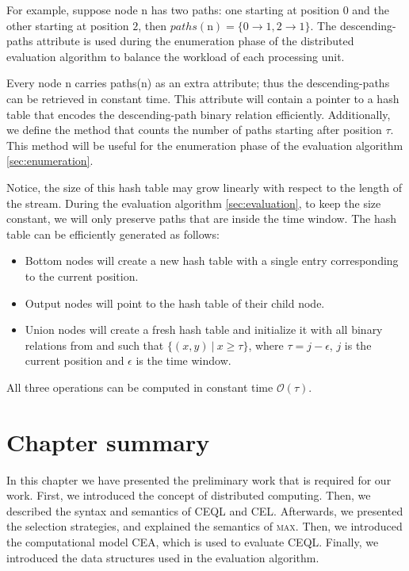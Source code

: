 {For example, suppose node \textrm{n} has two paths: one starting at position $0$ and the other starting at position $2$, then $paths(\textrm{n}) = {\{0 \to 1, 2 \to 1\}}$. The descending-paths attribute is used during the enumeration phase of the distributed evaluation algorithm to balance the workload of each processing unit.

Every node \textrm{n} carries paths(\textrm{n}) as an extra attribute; thus the descending-paths can be retrieved in constant time. This attribute will contain a pointer to a hash table that encodes the descending-path binary relation efficiently. Additionally, we define the method  that counts the number of paths starting after position $\tau$. This method will be useful for the enumeration phase of the evaluation algorithm \ref{sec:enumeration}.

Notice, the size of this hash table may grow linearly with respect to the length of the stream. During the evaluation algorithm \ref{sec:evaluation}, to keep the size constant, we will only preserve paths that are inside the time window. The hash table can be efficiently generated as follows:

\begin{itemize}
  \item Bottom nodes will create a new hash table with a single entry corresponding to the current position.
  \item Output nodes will point to the hash table of their child node.
  \item Union nodes will create a fresh hash table and initialize it with all binary relations from  and  such that $\{(x, y) \ | \ x \ge \tau\}$, where $\tau = j - \epsilon$, $j$ is the current position and $\epsilon$ is the time window.
\end{itemize}

All three operations can be computed in constant time $\mathcal{O}(\tau)$.
}

\section{Chapter summary}

In this chapter we have presented the preliminary work that is required for our work. First, we introduced the concept of distributed computing. Then, we described the syntax and semantics of CEQL and CEL. Afterwards, we presented the selection strategies, and explained the semantics of \textsc{max}. Then, we introduced the computational model CEA, which is used to evaluate CEQL. Finally, we introduced the data structures used in the evaluation algorithm.
